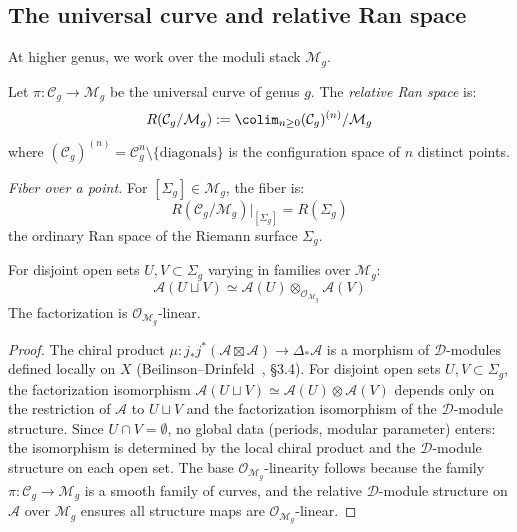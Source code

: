 \subsection{The universal curve and relative Ran space}
\label{subsec:universal-curve-ran}

At higher genus, we work over the moduli stack $\mathcal{M}_g$.

\begin{construction}\label{const:relative-ran}
Let $\pi: \mathcal{C}_g \to \mathcal{M}_g$ be the universal curve of genus $g$. The \emph{relative Ran space} is:
\[R(\mathcal{C}_g/\mathcal{M}_g) := \colim_{n \geq 0} (\mathcal{C}_g)^{(n)}/\mathcal{M}_g\]
where $(\mathcal{C}_g)^{(n)} = \mathcal{C}_g^n \setminus \{\text{diagonals}\}$ is the configuration space of $n$ distinct points.

\emph{Fiber over a point.} For $[\Sigma_g] \in \mathcal{M}_g$, the fiber is:
\[R(\mathcal{C}_g/\mathcal{M}_g)|_{[\Sigma_g]} = R(\Sigma_g)\]
the ordinary Ran space of the Riemann surface $\Sigma_g$.
\end{construction}

\begin{proposition}\label{prop:factorization-over-moduli}
For disjoint open sets $U, V \subset \Sigma_g$ varying in families over $\mathcal{M}_g$:
\[\mathcal{A}(U \sqcup V) \simeq \mathcal{A}(U) \otimes_{\mathcal{O}_{\mathcal{M}_g}} \mathcal{A}(V)\]
The factorization is $\mathcal{O}_{\mathcal{M}_g}$-linear.
\end{proposition}

\begin{proof}
The chiral product $\mu\colon j_*j^*(\mathcal{A} \boxtimes \mathcal{A}) \to \Delta_*\mathcal{A}$ is a morphism of $\mathcal{D}$-modules defined locally on $X$ (Beilinson--Drinfeld~\cite{BD04}, \S3.4). For disjoint open sets $U, V \subset \Sigma_g$, the factorization isomorphism $\mathcal{A}(U \sqcup V) \simeq \mathcal{A}(U) \otimes \mathcal{A}(V)$ depends only on the restriction of $\mathcal{A}$ to $U \sqcup V$ and the factorization isomorphism of the $\mathcal{D}$-module structure. Since $U \cap V = \emptyset$, no global data (periods, modular parameter) enters: the isomorphism is determined by the local chiral product and the $\mathcal{D}$-module structure on each open set. The base $\mathcal{O}_{\mathcal{M}_g}$-linearity follows because the family $\pi\colon \mathcal{C}_{g} \to \mathcal{M}_g$ is a smooth family of curves, and the relative $\mathcal{D}$-module structure on $\mathcal{A}$ over $\mathcal{M}_g$ ensures all structure maps are $\mathcal{O}_{\mathcal{M}_g}$-linear.
\end{proof}

